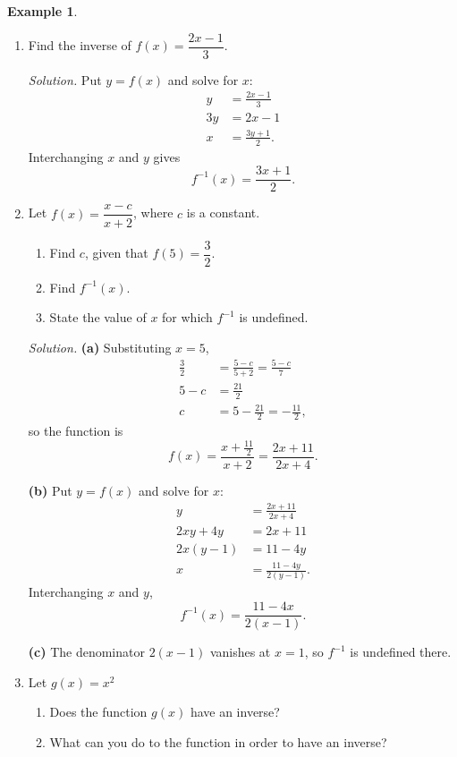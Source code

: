 \documentclass[11pt,a4paper]{article}
\theoremstyle{definition}
\newtheorem{example}[thm]{Example}
\begin{document}
\begin{example}

\begin{enumerate}
\item Find the inverse of $f(x)=\dfrac{2x-1}{3}$.

\emph{Solution.} Put $y=f(x)$ and solve for $x$:
\begin{align*}
y & = \frac{2x-1}{3}\\
3y & = 2x-1\\
x & = \frac{3y+1}{2} .
\end{align*}
Interchanging $x$ and $y$ gives
$$f^{-1}(x)=\frac{3x+1}{2}.$$

\item Let $f(x)=\dfrac{x-c}{x+2}$, where $c$ is a constant.
\begin{enumerate}
       \item Find $c$, given that $f(5)=\dfrac{3}{2}$.
       \item Find $f^{-1}(x)$.
       \item State the value of $x$ for which $f^{-1}$ is undefined.
\end{enumerate}

\emph{Solution.} \textbf{(a)} Substituting $x=5$,
\begin{align*}
\frac{3}{2} & = \frac{5-c}{5+2} = \frac{5-c}{7}\\
5-c & = \frac{21}{2}\\
c & = 5-\frac{21}{2} = -\frac{11}{2},
\end{align*}
so the function is
$$f(x)=\frac{x+\frac{11}{2}}{x+2}=\frac{2x+11}{2x+4}.$$

\textbf{(b)} Put $y=f(x)$ and solve for $x$:
\begin{align*}
y & = \frac{2x+11}{2x+4}\\
2xy+4y & = 2x+11\\
2x(y-1) & = 11-4y\\
x & = \frac{11-4y}{2(y-1)} .
\end{align*}
Interchanging $x$ and $y$,
$$f^{-1}(x)=\frac{11-4x}{2(x-1)} .$$

\textbf{(c)} The denominator $2(x-1)$ vanishes at $x=1$, so $f^{-1}$ is
undefined there.

\item Let $g(x)=x^2$
\begin{enumerate}
     \item Does the function $g(x)$ have an inverse?
     \item What can you do to the function in order to have an inverse?\\
\end{enumerate}


\end{enumerate}
\end{example}
\end{document}
